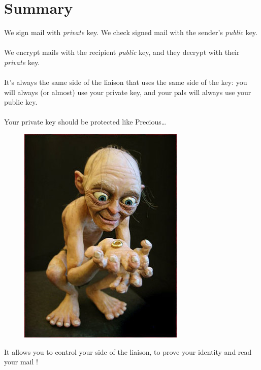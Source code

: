 \section{Summary}\label{summary}

We sign mail with \emph{private} key. We check signed mail with the sender's \emph{public} key.\\
\\
We encrypt mails with the recipient \emph{public} key, and they decrypt with their \emph{private} key.\\
\\
It's always the same side of the liaison that uses the same side of the key: you will always (or almost) use your private key, and your pals
will always use your public key.\\
\\
Your private key should be protected like Precious\ldots{}

\begin{figure}[htbp]
\centering
\includegraphics{./images/gollum.jpg}
\caption{}
\end{figure}

It allows you to control your side of the liaison, to prove your identity and read your mail !